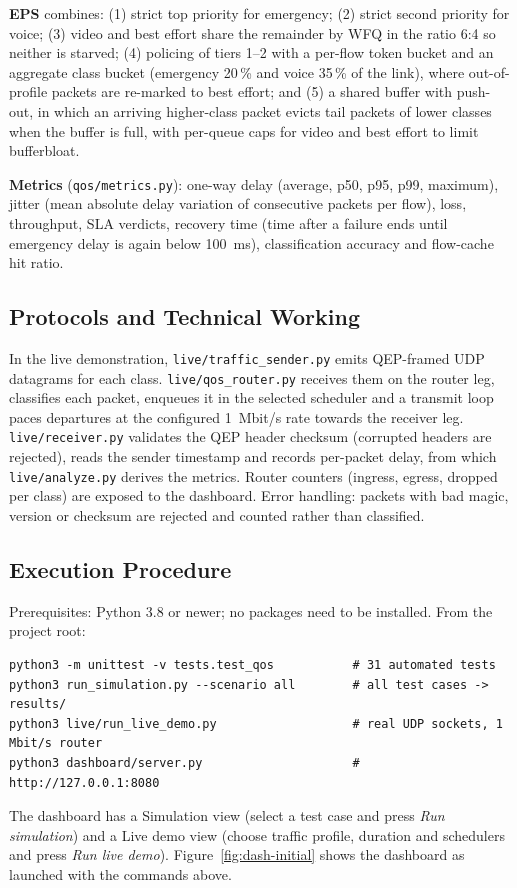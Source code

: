 \documentclass[12pt,a4paper]{article}
\newcommand{\code}[1]{\texttt{#1}}
\begin{document}
\textbf{EPS} combines: (1) strict top priority for emergency; (2) strict second priority for voice;
(3) video and best effort share the remainder by WFQ in the ratio 6:4 so neither is starved;
(4) policing of tiers 1--2 with a per-flow token bucket and an aggregate class bucket (emergency
20\,\% and voice 35\,\% of the link), where out-of-profile packets are re-marked to best effort; and
(5) a shared buffer with push-out, in which an arriving higher-class packet evicts tail packets of
lower classes when the buffer is full, with per-queue caps for video and best effort to limit
bufferbloat.

\textbf{Metrics} (\code{qos/metrics.py}): one-way delay (average, p50, p95, p99, maximum), jitter
(mean absolute delay variation of consecutive packets per flow), loss, throughput, SLA verdicts,
recovery time (time after a failure ends until emergency delay is again below 100~ms),
classification accuracy and flow-cache hit ratio.

\subsection{Protocols and Technical Working}
In the live demonstration, \code{live/traffic\_sender.py} emits QEP-framed UDP datagrams for each
class. \code{live/qos\_router.py} receives them on the router leg, classifies each packet, enqueues
it in the selected scheduler and a transmit loop paces departures at the configured 1~Mbit/s rate towards
the receiver leg. \code{live/receiver.py} validates the QEP header checksum (corrupted headers are
rejected), reads the sender timestamp and records per-packet delay, from which
\code{live/analyze.py} derives the metrics. Router counters (ingress, egress, dropped per class)
are exposed to the dashboard. Error handling: packets with bad magic, version or checksum are
rejected and counted rather than classified.

\subsection{Execution Procedure}
Prerequisites: Python 3.8 or newer; no packages need to be installed. From the project root:
\begin{lstlisting}
python3 -m unittest -v tests.test_qos           # 31 automated tests
python3 run_simulation.py --scenario all        # all test cases -> results/
python3 live/run_live_demo.py                   # real UDP sockets, 1 Mbit/s router
python3 dashboard/server.py                     # http://127.0.0.1:8080
\end{lstlisting}
The dashboard has a Simulation view (select a test case and press \emph{Run simulation}) and a
Live demo view (choose traffic profile, duration and schedulers and press \emph{Run live demo}).
Figure~\ref{fig:dash-initial} shows the dashboard as launched with the commands above.
\end{document}

